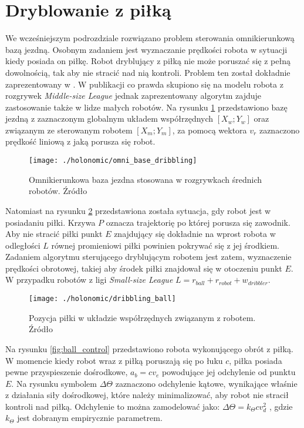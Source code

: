 \section{Dryblowanie z piłką}
We wcześniejszym podrozdziale rozwiązano problem sterowania omnikierunkową bazą jezdną. Osobnym zadaniem jest wyznaczanie prędkości robota w sytuacji kiedy posiada on piłkę.
Robot dryblujący z piłką nie może poruszać się z pełną dowolnością, tak aby nie stracić nad nią kontroli. Problem ten został dokładnie zaprezentowany w \cite{dribbling}. W publikacji co prawda skupiono
się na modelu robota z rozgrywek \emph{Middle-size League} jednak zaprezentowany algorytm zajduje zastosowanie także w lidze małych robotów.
Na rysunku \ref{fig:omni_base_dribbling} przedstawiono bazę jezdną z zaznaczonym globalnym układem współrzędnych $[X_w;Y_w]$ oraz związanym ze sterowanym robotem $[X_m;Y_m]$, za pomocą wektora $v_r$ zaznaczono
prędkość liniową z jaką porusza się robot.
\begin{figure}[h]
\centering
\texttt{[image: ./holonomic/omni\_base\_dribbling]}
\caption{Omnikierunkowa baza jezdna stosowana w rozgrywkach średnich robotów. Źródło \cite{dribbling}}\label{fig:omni_base_dribbling}
\end{figure}
Natomiast na rysunku \ref{fig:dribbling_ball} przedstawiona została sytuacja, gdy robot jest w posiadaniu piłki. Krzywa $P$ oznacza trajektorię po której porusza się zawodnik. Aby nie stracić piłki
punkt $E$ znajdujący się dokładnie na wprost robota w odległości $L$ równej promieniowi piłki powinien pokrywać się z jej środkiem. Zadaniem algorytmu sterującego dryblującym robotem jest zatem, wyznaczenie
prędkości obrotowej, takiej aby środek piłki znajdował się w otoczeniu punkt $E$. W przypadku robotów z ligi \emph{Small-size League} $L=r_{ball}+r_{robot} +w_{dribbler}$.
\begin{figure}[h]
\centering
\texttt{[image: ./holonomic/dribbling\_ball]}
\caption{ Pozycja piłki w układzie współrzędnych związanym z robotem. Źródło \cite{dribbling} }\label{fig:dribbling_ball}
\end{figure}
Na rysunku \ref{fig:ball_control} przedstawiono robota wykonującego obrót z piłką. W momencie kiedy robot wraz z piłką poruszają się po łuku $c$, piłka posiada pewne przyspieszenie dośrodkowe,
$a_b=cv_e$ powodujące jej odchylenie od punktu $E$. Na rysunku symbolem $\Delta\Theta$ zaznaczono odchylenie kątowe, wynikające właśnie z działania siły dośrodkowej, które należy minimalizować,
 aby robot nie stracił kontroli nad piłką. Odchylenie to można zamodelować jako: $\Delta\Theta=k_{\Theta}cv_{d}^2$ , gdzie $k_{\Theta}$ jest dobranym empirycznie parametrem.
